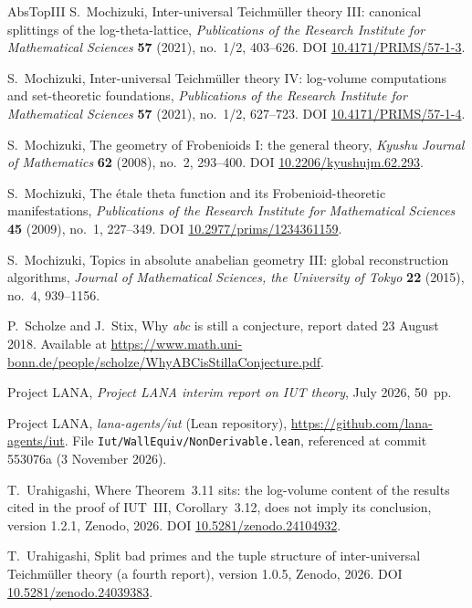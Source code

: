 \documentclass[11pt]{article}
\theoremstyle{plain}
\theoremstyle{definition}
\theoremstyle{remark}
\begin{document}
\begin{thebibliography}{AbsTopIII}
 S.~Mochizuki, Inter-universal Teichm\"uller
theory III: canonical splittings of the log-theta-lattice,
\emph{Publications of the Research Institute for Mathematical
Sciences} \textbf{57} (2021), no.~1/2, 403--626.
DOI \href{https://doi.org/10.4171/PRIMS/57-1-3}{10.4171/PRIMS/57-1-3}.

 S.~Mochizuki, Inter-universal Teichm\"uller
theory IV: log-volume computations and set-theoretic foundations,
\emph{Publications of the Research Institute for Mathematical
Sciences} \textbf{57} (2021), no.~1/2, 627--723.
DOI \href{https://doi.org/10.4171/PRIMS/57-1-4}{10.4171/PRIMS/57-1-4}.

 S.~Mochizuki, The geometry of Frobenioids I:
the general theory, \emph{Kyushu Journal of Mathematics}
\textbf{62} (2008), no.~2, 293--400.
DOI \href{https://doi.org/10.2206/kyushujm.62.293}{10.2206/kyushujm.62.293}.

 S.~Mochizuki, The \'etale theta function and
its Frobenioid-theoretic manifestations, \emph{Publications of the
Research Institute for Mathematical Sciences} \textbf{45} (2009),
no.~1, 227--349.
DOI \href{https://doi.org/10.2977/prims/1234361159}{10.2977/prims/1234361159}.

 S.~Mochizuki, Topics in absolute
anabelian geometry III: global reconstruction algorithms,
\emph{Journal of Mathematical Sciences, the University of Tokyo}
\textbf{22} (2015), no.~4, 939--1156.

 P.~Scholze and J.~Stix, Why \emph{abc} is
still a conjecture, report dated 23 August 2018.
Available at
\url{https://www.math.uni-bonn.de/people/scholze/WhyABCisStillaConjecture.pdf}.

 Project LANA, \emph{Project LANA interim
report on IUT theory}, July 2026, 50~pp.

 Project LANA, \emph{lana-agents/iut} (Lean
repository), \url{https://github.com/lana-agents/iut}.  File
\texttt{Iut/WallEquiv/NonDerivable.lean}, referenced at commit
553076a (3 November 2026).

 T.~Urahigashi, Where Theorem~3.11 sits: the
log-volume content of the results cited in the proof of IUT~III,
Corollary~3.12, does not imply its conclusion, version 1.2.1,
Zenodo, 2026.
DOI \href{https://doi.org/10.5281/zenodo.24104932}{10.5281/zenodo.24104932}.

 T.~Urahigashi, Split bad primes and the tuple
structure of inter-universal Teichm\"uller theory (a fourth report),
version 1.0.5, Zenodo, 2026.
DOI \href{https://doi.org/10.5281/zenodo.24039383}{10.5281/zenodo.24039383}.


\end{thebibliography}
\end{document}
